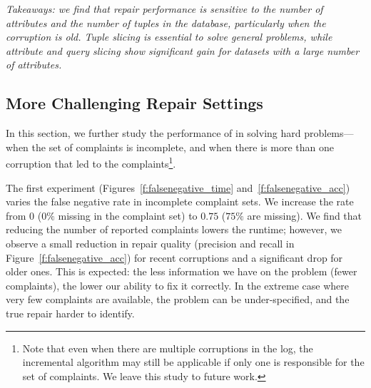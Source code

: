 \smallskip
\textit{
  Takeaways: we find that repair performance is sensitive to 
  the number of attributes and the number of tuples in the database, particularly when the corruption is old. 
  Tuple slicing is essential to solve general problems, while attribute and query slicing show significant gain for datasets with a large number of attributes.
}
\subsection{More Challenging Repair Settings}
\label{sec:experiments:hardprob}

In this section, we further study the performance of \sys in solving hard problems---when the set of complaints is incomplete, and when there is more than one corruption that led to the complaints\footnote{
\footnotesize Note that even when there are multiple corruptions in the log, the incremental algorithm may still be applicable if only one is responsible for the set of complaints.  We leave this study to future work.}.
 
 
The first experiment (Figures~\ref{f:falsenegative_time} and~\ref{f:falsenegative_acc}) varies the false negative rate in incomplete complaint sets.
We increase the rate from $0$ ($0\%$ missing in the complaint set) to $0.75$ ($75\%$ are missing).  
We find that reducing the number of reported complaints lowers the
runtime; however, we observe a small reduction in repair quality (precision
and recall in Figure~\ref{f:falsenegative_acc}) for recent corruptions and a
significant drop for older ones. This is expected: the less information we
have on the problem (fewer complaints), the lower our ability to fix it
correctly. In the extreme case where very few complaints are available, the
problem can be under-specified, and the true repair harder to identify.



